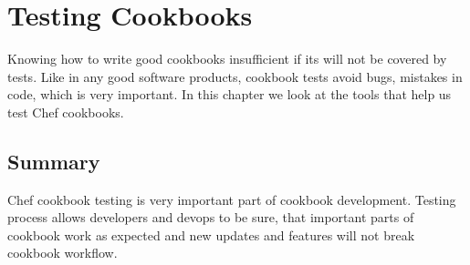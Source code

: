 \chapter{Testing Cookbooks}

Knowing how to write good cookbooks insufficient if its will not be covered by tests. Like in any good software products, cookbook tests avoid bugs, mistakes in code, which is very important. In this chapter we look at the tools that help us test Chef cookbooks.










\section{Summary}

Chef cookbook testing is very important part of cookbook development. Testing process allows developers and devops to be sure, that important parts of cookbook work as expected and new updates and features will not break cookbook workflow.
